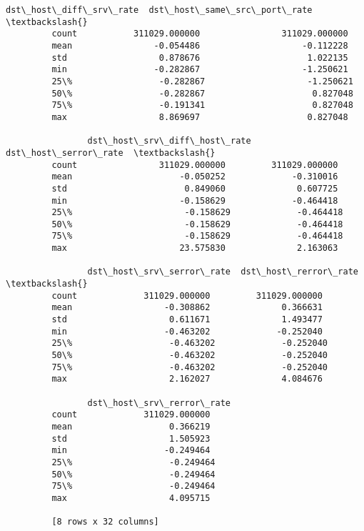 \documentclass[11pt]{article}
\begin{document}
\begin{Verbatim}[commandchars=\\\{\}]
                dst\_host\_diff\_srv\_rate  dst\_host\_same\_src\_port\_rate  \textbackslash{}
         count           311029.000000                311029.000000   
         mean                -0.054486                    -0.112228   
         std                  0.878676                     1.022135   
         min                 -0.282867                    -1.250621   
         25\%                 -0.282867                    -1.250621   
         50\%                 -0.282867                     0.827048   
         75\%                 -0.191341                     0.827048   
         max                  8.869697                     0.827048   
         
                dst\_host\_srv\_diff\_host\_rate  dst\_host\_serror\_rate  \textbackslash{}
         count                311029.000000         311029.000000   
         mean                     -0.050252             -0.310016   
         std                       0.849060              0.607725   
         min                      -0.158629             -0.464418   
         25\%                      -0.158629             -0.464418   
         50\%                      -0.158629             -0.464418   
         75\%                      -0.158629             -0.464418   
         max                      23.575830              2.163063   
         
                dst\_host\_srv\_serror\_rate  dst\_host\_rerror\_rate  \textbackslash{}
         count             311029.000000         311029.000000   
         mean                  -0.308862              0.366631   
         std                    0.611671              1.493477   
         min                   -0.463202             -0.252040   
         25\%                   -0.463202             -0.252040   
         50\%                   -0.463202             -0.252040   
         75\%                   -0.463202             -0.252040   
         max                    2.162027              4.084676   
         
                dst\_host\_srv\_rerror\_rate  
         count             311029.000000  
         mean                   0.366219  
         std                    1.505923  
         min                   -0.249464  
         25\%                   -0.249464  
         50\%                   -0.249464  
         75\%                   -0.249464  
         max                    4.095715  
         
         [8 rows x 32 columns]
\end{Verbatim}
            
\end{document}
